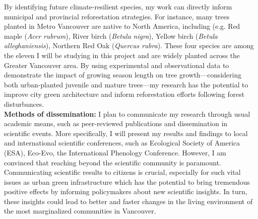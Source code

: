\documentclass[11pt,letter]{article}
\begin{document}
\par By identifying future climate-resilient species, my work can directly inform municipal and provincial reforestation strategies. For instance, many trees planted in Metro Vancouver are native to North America, including (e.g. Red maple (\textit{Acer rubrum}), River birch (\textit{Betula nigra}), Yellow birch (\textit{Betula alleghaniensis}), Northern Red Oak (\textit{Quercus rubra}). These four species are among the eleven I will be studying in this project and are widely planted across the Greater Vancouver area. By using experimental and observational data to demonstrate the impact of growing season length on tree growth—considering both urban-planted juvenile and mature trees—my research has the potential to improve city green architecture and inform reforestation efforts following forest disturbances.\\
\textbf{Methods of dissemination:} I plan to communicate my research through usual academic means, such as peer-reviewed publications and dissemination in scientific events. More specifically, I will present my results and findings to local and international scientific conferences, such as Ecological Society of America (ESA), Eco-Evo, the International Phenology Conference. However, I am convinced that reaching beyond the scientific community is paramount.
Communicating scientific results to citizens is crucial, especially for such vital issues as urban green infrastructure which has the potential to bring tremendous positive effects by informing policymakers about new scientific insights. In turn, these insights could lead to better and faster changes in the living environment of the most marginalized communities in Vancouver.
\end{document}
